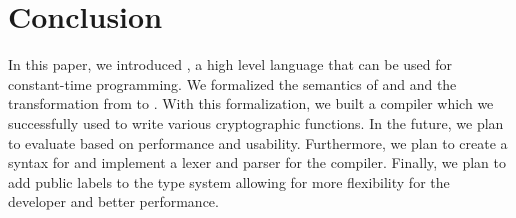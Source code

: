 \section{Conclusion}
In this paper, we introduced \constc, a high level language that can be used for constant-time programming. We formalized the semantics of \constc and \ccore and the transformation from \constc to \ccore. With this formalization, we built a \constc compiler which we successfully used to write various cryptographic functions. In the future, we plan to evaluate \constc based on performance and usability. Furthermore, we plan to create a syntax for \constc and implement a lexer and parser for the compiler. Finally, we plan to add public labels to the type system allowing for more flexibility for the developer and better performance.

